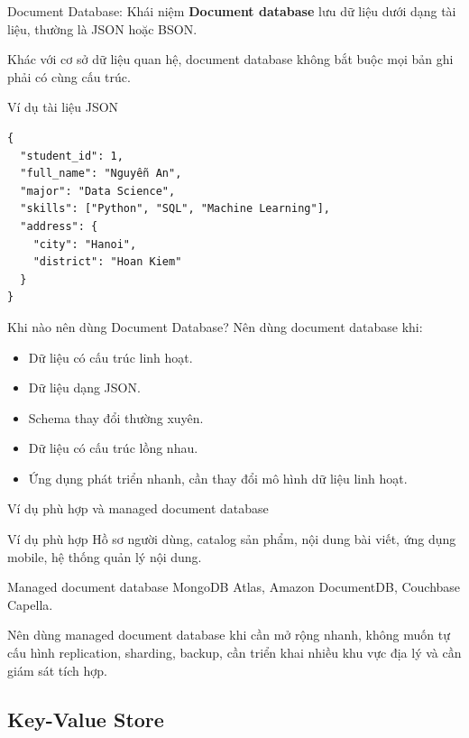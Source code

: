 \documentclass[aspectratio=169,11pt]{beamer}
\newcommand{\keyword}[1]{\textcolor{accent}{\textbf{#1}}}
\newcommand{\kw}[1]{\keyword{#1}}
\newcommand{\smallitem}{\setlength{\itemsep}{2pt}\setlength{\parskip}{0pt}}
\begin{document}
\begin{frame}{Document Database: Khái niệm}
\kw{Document database} lưu dữ liệu dưới dạng tài liệu, thường là JSON hoặc BSON.

\vspace{2mm}
Khác với cơ sở dữ liệu quan hệ, document database không bắt buộc mọi bản ghi phải có cùng cấu trúc.
\end{frame}

\begin{frame}[fragile]{Ví dụ tài liệu JSON}
\small
\begin{verbatim}
{
  "student_id": 1,
  "full_name": "Nguyễn An",
  "major": "Data Science",
  "skills": ["Python", "SQL", "Machine Learning"],
  "address": {
    "city": "Hanoi",
    "district": "Hoan Kiem"
  }
}
\end{verbatim}
\end{frame}

\begin{frame}{Khi nào nên dùng Document Database?}
Nên dùng document database khi:
\begin{itemize}
  \smallitem
  \item Dữ liệu có cấu trúc linh hoạt.
  \item Dữ liệu dạng JSON.
  \item Schema thay đổi thường xuyên.
  \item Dữ liệu có cấu trúc lồng nhau.
  \item Ứng dụng phát triển nhanh, cần thay đổi mô hình dữ liệu linh hoạt.
\end{itemize}
\end{frame}

\begin{frame}{Ví dụ phù hợp và managed document database}
\begin{block}{Ví dụ phù hợp}
Hồ sơ người dùng, catalog sản phẩm, nội dung bài viết, ứng dụng mobile, hệ thống quản lý nội dung.
\end{block}

\begin{block}{Managed document database}
MongoDB Atlas, Amazon DocumentDB, Couchbase Capella.
\end{block}

Nên dùng managed document database khi cần mở rộng nhanh, không muốn tự cấu hình replication, sharding, backup, cần triển khai nhiều khu vực địa lý và cần giám sát tích hợp.
\end{frame}

\subsection{Key-Value Store}
\end{document}

